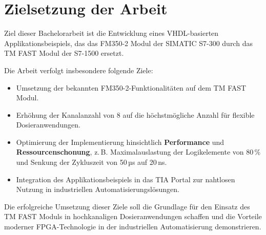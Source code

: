 \section{Zielsetzung der Arbeit} 
Ziel dieser Bachelorarbeit ist die Entwicklung eines VHDL-basierten Applikationsbeispiels, das das FM350-2 Modul der SIMATIC S7-300 durch das TM FAST Modul der S7-1500 ersetzt. 

Die Arbeit verfolgt insbesondere folgende Ziele:

\begin{itemize}
    \item Umsetzung der bekannten FM350-2-Funktionalitäten auf dem TM FAST Modul.
    \item Erhöhung der Kanalanzahl von 8 auf die höchstmögliche Anzahl für flexible Dosieranwendungen.
    \item Optimierung der Implementierung hinsichtlich \textbf{Performance} und \textbf{Ressourcenschonung}, z.\,B. Maximalauslastung der Logikelemente von 80\,\% und Senkung der Zykluszeit von 50\,µs auf 20\,ns.
    \item Integration des Applikationsbeispiels in das TIA Portal zur nahtlosen Nutzung in industriellen Automatisierungslösungen.
\end{itemize}

Die erfolgreiche Umsetzung dieser Ziele soll die Grundlage für den Einsatz des TM FAST Moduls in hochkanaligen Dosieranwendungen schaffen und die Vorteile moderner FPGA-Technologie in der industriellen Automatisierung demonstrieren.


